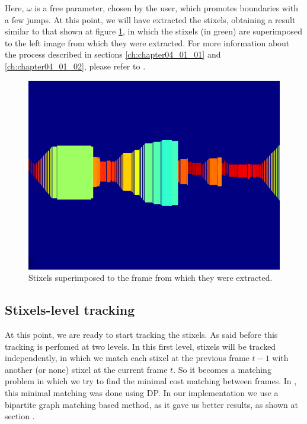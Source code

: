 Here, $\omega$ is a free parameter, chosen by the user, which promotes boundaries with a few jumps. At this point, we will have extracted the stixels, obtaining a result similar to that shown at figure \ref{fig:cp04_stixels}, in which the stixels (in green) are superimposed to the left image from which they were extracted. For more information about the process described in sections \ref{ch:chapter04_01_01} and \ref{ch:chapter04_01_02}, please refer to \cite{benenson2012fast}.

\begin{figure}[h!]
  \centering
  \includegraphics{stixels}
  \caption{Stixels superimposed to the frame from which they were extracted.}\label{fig:cp04_stixels}
\end{figure}

\subsection{Stixels-level tracking}\label{ch:chapter04_01_03}

At this point, we are ready to start tracking the stixels. As said before this tracking is perfomed at two levels. In this first level, stixels will be tracked independently, in which we match each stixel at the previous frame $t - 1$ with another (or none) stixel at the current frame $t$. So it becomes a matching problem in which we try to find the minimal cost matching between frames. In \cite{gunyel2012stixels}, this minimal matching was done using \ac{DP}. In our implementation we use a bipartite graph matching based method, as it gave us better results, as shown at section .

